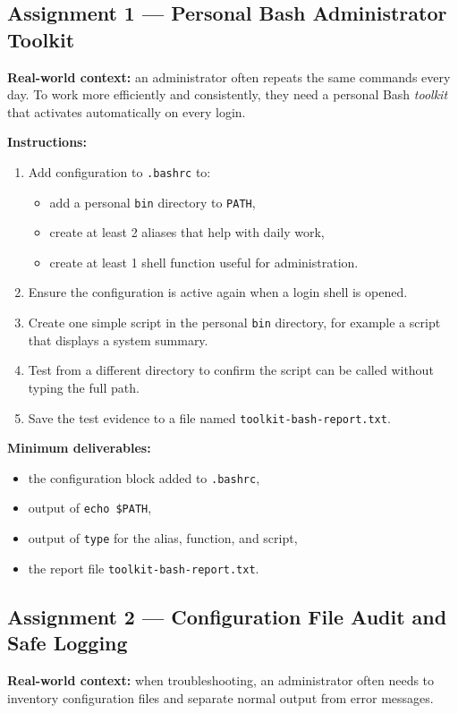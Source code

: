 \subsection*{Assignment 1 --- Personal Bash Administrator Toolkit}
\textbf{Real-world context:} an administrator often repeats the same commands
every day. To work more efficiently and consistently, they need a personal
Bash \textit{toolkit} that activates automatically on every login.

\textbf{Instructions:}
\begin{enumerate}
  \item Add configuration to \texttt{.bashrc} to:
  \begin{itemize}
    \item add a personal \texttt{bin} directory to \texttt{PATH},
    \item create at least 2 aliases that help with daily work,
    \item create at least 1 shell function useful for administration.
  \end{itemize}
  \item Ensure the configuration is active again when a login shell is opened.
  \item Create one simple script in the personal \texttt{bin} directory, for
    example a script that displays a system summary.
  \item Test from a different directory to confirm the script can be called
    without typing the full path.
  \item Save the test evidence to a file named \texttt{toolkit-bash-report.txt}.
\end{enumerate}

\textbf{Minimum deliverables:}
\begin{itemize}
  \item the configuration block added to \texttt{.bashrc},
  \item output of \texttt{echo \$PATH},
  \item output of \texttt{type} for the alias, function, and script,
  \item the report file \texttt{toolkit-bash-report.txt}.
\end{itemize}

\subsection*{Assignment 2 --- Configuration File Audit and Safe Logging}
\textbf{Real-world context:} when troubleshooting, an administrator often
needs to inventory configuration files and separate normal output from error
messages.

